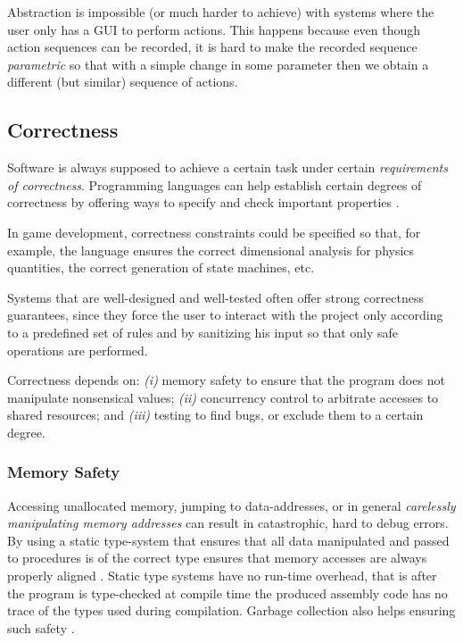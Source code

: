 Abstraction is impossible (or much harder to achieve) with systems where the user only has a GUI to perform actions. This happens because even though action sequences can be recorded, it is hard to make the recorded sequence \textit{parametric} so that with a simple change in some parameter then we obtain a different (but similar) sequence of actions.

\subsection{Correctness}
Software is always supposed to achieve a certain task under certain \textit{requirements of correctness}. Programming languages can help establish certain degrees of correctness by offering ways to specify and check important properties \cite{CHAPTER_1_PL_STATIC_ANALYSIS}.

In game development, correctness constraints could be specified so that, for example, the language ensures the correct dimensional analysis for physics quantities, the correct generation of state machines, etc.

Systems that are well-designed and well-tested often offer strong correctness guarantees, since they force the user to interact with the project only according to a predefined set of rules and by sanitizing his input so that only safe operations are performed.

Correctness depends on: \textit{(i)} memory safety to ensure that the program does not manipulate nonsensical values; \textit{(ii)} concurrency control to arbitrate accesses to shared resources; and \textit{(iii)} testing to find bugs, or exclude them to a certain degree.

\subsubsection{Memory Safety}
Accessing unallocated memory, jumping to data-addresses, or in general \textit{carelessly manipulating memory addresses} can result in catastrophic, hard to debug errors. By using a static type-system that ensures that all data manipulated and passed to procedures is of the correct type ensures that memory accesses are always properly aligned \cite{CHAPTER_1_PL_TYPE_SYSTEMS_AND_MEMORY_ALIGNMENT}. Static type systems have no run-time overhead, that is after the program is type-checked at compile time the produced assembly code has no trace of the types used during compilation. Garbage collection also helps ensuring such safety \cite{CHAPTER_1_PL_GARBAGE_COLLECTION}.

